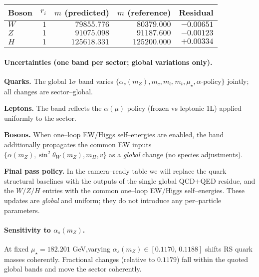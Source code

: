 \documentclass[epjc3]{svjour3}
\begin{document}
\begin{center}
\begin{tabular}{lrrrr}
\toprule
Boson & $r_i$ & $\widehat m$ (predicted) & $m$ (reference) & Residual \\
\midrule
$W$ & $1$ & $79855.776$   & $80379.000$   & $-0.00651$ \\
$Z$ & $1$ & $91075.098$   & $91187.600$   & $-0.00123$ \\
$H$ & $1$ & $125618.331$  & $125200.000$  & $+0.00334$ \\
\bottomrule
\end{tabular}
\end{center}

\paragraph{Uncertainties (one band per sector; global variations only).}
\textbf{Quarks.} The global $1\sigma$ band varies $\{\alpha_s(m_Z),m_c,m_b,m_t,\mu_\star,\alpha\text{-policy}\}$ jointly; all changes are sector–global.

\textbf{Leptons.} The band reflects the $\alpha(\mu)$ policy (frozen vs leptonic 1L) applied uniformly to the sector.

\textbf{Bosons.} When one–loop EW/Higgs self–energies are enabled, the band additionally propagates the common EW inputs $\{\alpha(m_Z),\sin^2\theta_W(m_Z),m_H,v\}$ as a \emph{global} change (no species adjustments).

\medskip
\noindent\textbf{Final pass policy.}
In the camera–ready table we will replace the quark structural baselines with the outputs of the single global QCD$+$QED residue, and the $W/Z/H$ entries with the common one–loop EW/Higgs self–energies. These updates are \emph{global} and uniform; they do not introduce any per–particle parameters.

\paragraph{Sensitivity to $\alpha_s(m_Z)$.}
At fixed $\mu_\star=182.201$ GeV,\linebreak[3] varying $\alpha_s(m_Z)\in[0.1170,\,0.1188]$ shifts RS quark masses coherently. Fractional changes (relative to $0.1179$) fall within the quoted global bands and move the sector coherently.
\end{document}
